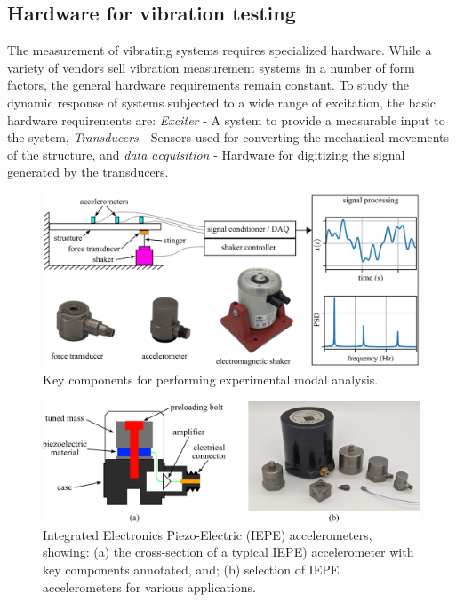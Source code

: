 \documentclass[12pt,letter]{article}
\begin{document}
		
\subsection{Hardware for vibration testing}

The measurement of vibrating systems requires specialized hardware. While a variety of vendors sell vibration measurement systems in a number of form factors, the general hardware requirements remain constant. To study the dynamic response of systems subjected to a wide range of excitation, the basic hardware requirements are: \emph{Exciter} - A system to provide a measurable input to the system, \emph{Transducers} - Sensors used for converting the mechanical movements of the structure, and \emph{data acquisition} - Hardware for digitizing the signal generated by the transducers.

\begin{figure}[H]
	\centering
	\includegraphics[]{../figures/vibration_testing.png}
	\caption{Key components for performing experimental modal analysis.}
	\label{fig:vibration_testing}
\end{figure} 




 

\begin{figure}[H]
    \centering
    \includegraphics[width=6.5in]{../figures/accelerometers}
    \caption{Integrated Electronics Piezo-Electric (IEPE) accelerometers, showing: (a) the cross-section of a typical IEPE) accelerometer with key components annotated, and; (b) selection of IEPE accelerometers for various applications.}
    \label{fig:accelerometers}
\end{figure} 
\end{document}
